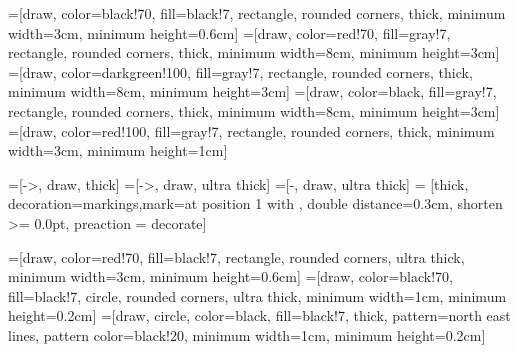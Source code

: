 \newcommand*\todo[1]{\stepcounter{todoCtr}%
        {\bf\textcolor{red}{TODO} \#\arabic{todoCtr}: }%
        \textcolor{red}{#1} }


\usepackage{xspace}
\usetikzlibrary{patterns}
=[draw, color=black!70, fill=black!7, rectangle, rounded
corners, thick, minimum width=3cm, minimum height=0.6cm]
=[draw, color=red!70, fill=gray!7, rectangle, rounded
corners, thick, minimum width=8cm, minimum height=3cm]
=[draw, color=darkgreen!100, fill=gray!7, rectangle, rounded
corners, thick, minimum width=8cm, minimum height=3cm]
=[draw, color=black, fill=gray!7, rectangle, rounded
corners, thick, minimum width=8cm, minimum height=3cm]
=[draw, color=red!100, fill=gray!7, rectangle, rounded
corners, thick, minimum width=3cm, minimum height=1cm]

=[->, draw, thick]
=[->, draw, ultra thick]
=[-, draw, ultra thick]
 = [thick, decoration={markings,mark=at position
   1 with {}},
   double distance=0.3cm, shorten >= 0.0pt,
   preaction = {decorate}]



=[draw, color=red!70, fill=black!7, rectangle, rounded
corners, ultra thick, minimum width=3cm, minimum height=0.6cm]
=[draw, color=black!70, fill=black!7, circle, rounded
corners, ultra thick, minimum width=1cm, minimum height=0.2cm]
=[draw, circle, color=black, fill=black!7, thick, pattern=north east lines, pattern color=black!20, minimum width=1cm, minimum height=0.2cm]


